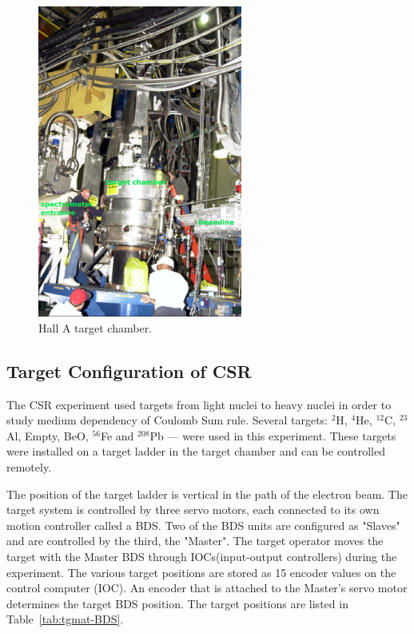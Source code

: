 \begin{figure}[tb!]
\centering
\includegraphics[width=0.6\textwidth]{figs/target_chamber_word.png}
\caption[Hall A target chamber]{Hall A target chamber.  \label{fig:target_chamber}}
\end{figure}

\subsection{Target Configuration of CSR}
The CSR experiment used targets from light nuclei to heavy nuclei in order to study medium dependency of 
Coulomb Sum rule.
Several targets: $^{2}$H, $^{4}$He, $^{12}$C, $^{23}$Al, Empty, BeO, $^{56}$Fe and $^{208}$Pb --- were used in this experiment.
These targets were installed on a target ladder in the target chamber and can be controlled remotely.


The position of the target ladder is vertical in the path of the electron beam.
The target system is controlled by three servo motors, each connected to its own motion controller called a BDS.
Two of  the BDS units are configured as "Slaves" and are controlled by the third, the "Master".
The target operator moves the target with the Master BDS through IOCs(input-output controllers) during the
experiment.
The various target positions are stored as 15 encoder values on the control computer (IOC). An encoder that is attached to
the Master's servo motor determines the target BDS position. The target positions are listed in Table~\ref{tab:tgmat-BDS}.

